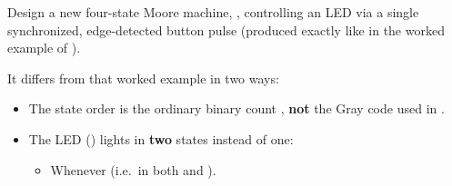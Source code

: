 \label{c8:set:1}

\label{c8:ex:1}
Design a new four-state Moore machine, , controlling an LED via a single
synchronized, edge-detected button pulse  (produced exactly like  in the worked
example of ).

It differs from that worked example in two ways:
\begin{itemize}
  \item The state order is the ordinary binary count ,
    \textbf{not} the Gray code used in .
  \item The LED () lights in \textbf{two} states instead of one:
    \begin{itemize}
      \item Whenever  (i.e.\ in both  and ).
    \end{itemize}
\end{itemize}

